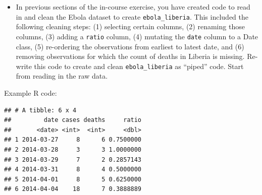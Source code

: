 \documentclass[]{book}
\makeatletter
\newenvironment{Shaded}{\begin{snugshade}}{\end{snugshade}}
\newcommand{\KeywordTok}[1]{\textcolor[rgb]{0.13,0.29,0.53}{\textbf{#1}}}
\newcommand{\DataTypeTok}[1]{\textcolor[rgb]{0.13,0.29,0.53}{#1}}
\newcommand{\StringTok}[1]{\textcolor[rgb]{0.31,0.60,0.02}{#1}}
\newcommand{\OperatorTok}[1]{\textcolor[rgb]{0.81,0.36,0.00}{\textbf{#1}}}
\newcommand{\NormalTok}[1]{#1}
\providecommand{\tightlist}{%
  \setlength{\itemsep}{0pt}\setlength{\parskip}{0pt}}
\newenvironment{kframe}{%
\medskip{}
\setlength{\fboxsep}{.8em}
 \def\at@end@of@kframe{}%
 \ifinner\ifhmode%
  \def\at@end@of@kframe{\end{minipage}}%
  \begin{minipage}{\columnwidth}%
 \fi\fi%
 \def\FrameCommand##1{\hskip\@totalleftmargin \hskip-\fboxsep
 \colorbox{shadecolor}{##1}\hskip-\fboxsep
     \hskip-\linewidth \hskip-\@totalleftmargin \hskip\columnwidth}%
 \MakeFramed {\advance\hsize-\width
   \@totalleftmargin\z@ \linewidth\hsize
   \@setminipage}}%
 {\par\unskip\endMakeFramed%
 \at@end@of@kframe}
\renewenvironment{Shaded}{\begin{kframe}}{\end{kframe}}
\theoremstyle{definition}
\theoremstyle{definition}
\theoremstyle{definition}
\theoremstyle{remark}
\makeatother
\begin{document}
\begin{itemize}
\tightlist
\item
  In previous sections of the in-course exercise, you have created code
  to read in and clean the Ebola dataset to create
  \texttt{ebola\_liberia}. This included the following cleaning steps:
  (1) selecting certain columns, (2) renaming those columns, (3) adding
  a \texttt{ratio} column, (4) mutating the \texttt{date} column to a
  Date class, (5) re-ordering the observations from earliest to latest
  date, and (6) removing observations for which the count of deaths in
  Liberia is missing. Re-write this code to create and clean
  \texttt{ebola\_liberia} as ``piped'' code. Start from reading in the
  raw data.
\end{itemize}

Example R code:

\begin{Shaded}
\end{Shaded}

\begin{verbatim}
## # A tibble: 6 x 4
##         date cases deaths     ratio
##       <date> <int>  <int>     <dbl>
## 1 2014-03-27     8      6 0.7500000
## 2 2014-03-28     3      3 1.0000000
## 3 2014-03-29     7      2 0.2857143
## 4 2014-03-31     8      4 0.5000000
## 5 2014-04-01     8      5 0.6250000
## 6 2014-04-04    18      7 0.3888889
\end{verbatim}
\end{document}
